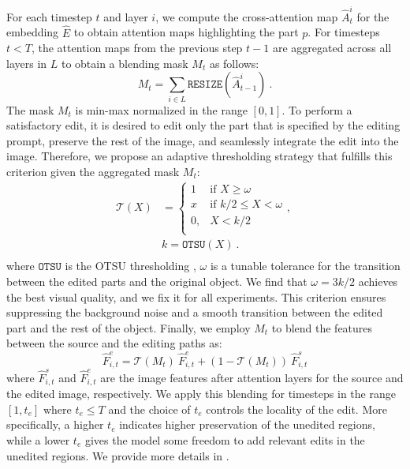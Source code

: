For each timestep $t$ and layer $i$, we compute the cross-attention map $\hat{A}_{t}^{i}$ for the embedding $\hat{E}$ to obtain attention maps highlighting the part $p$.
For timesteps $t<T$, the attention maps from the previous step $t-1$ are aggregated across all layers in $L$ to obtain a blending mask $M_t$ as follows:
\begin{equation}
    M_t = \sum_{i \in L} \texttt{RESIZE}(\hat{A}_{t-1}^{i}) \ .
\end{equation}
The mask $M_t$ is min-max normalized in the range $[0,1]$.
To perform a satisfactory edit, it is desired to edit only the part that is specified by the editing prompt, preserve the rest of the image, and seamlessly integrate the edit into the image.
Therefore, we propose an adaptive thresholding strategy that fulfills this criterion given the aggregated mask $M_t$:
\begin{equation}\label{eq:thresh}
    \begin{aligned}        
        \mathcal{T}(X) & = \begin{cases}
                            1 & \text{if } X\geq \omega \\
                            x & \text{if } k/2 \leq X < \omega \\
                            0,              & X < k/2 \\
                            \end{cases} , \ \\
        & k =  \texttt{OTSU}(X) \ . \\
    \end{aligned}
\end{equation}
where $\texttt{OTSU}$ is the OTSU thresholding \citep{otsu1975threshold}, $\omega$ is a tunable tolerance for the transition between the edited parts and the original object.
We find that $\omega=3k/2$ achieves the best visual quality, and we fix it for all experiments.
This criterion ensures suppressing the background noise and a smooth transition between the edited part and the rest of the object.
Finally, we employ $M_t$ to blend the features between the source and the editing paths as:
\begin{equation}\label{eq:feat_blend}
    \hat{F}_{i,t}^e = \mathcal{T}(M_t) \ \hat{F}_{i,t}^e + (1-\mathcal{T}(M_t)) \ \hat{F}_{i,t}^s
\end{equation}
where $\hat{F}_{i,t}^s$ and $\hat{F}_{i,t}^e$ are the image features after attention layers for the source and the edited image, respectively.
We apply this blending for timesteps in the range $[1,t_{e}]$ where $t_{e} \leq T$ and the choice of $t_{e}$ controls the locality of the edit.
More specifically, a higher $t_{e}$ indicates higher preservation of the unedited regions, while a lower $t_{e}$ gives the model some freedom to add relevant edits in the unedited regions.
We provide more details in .

